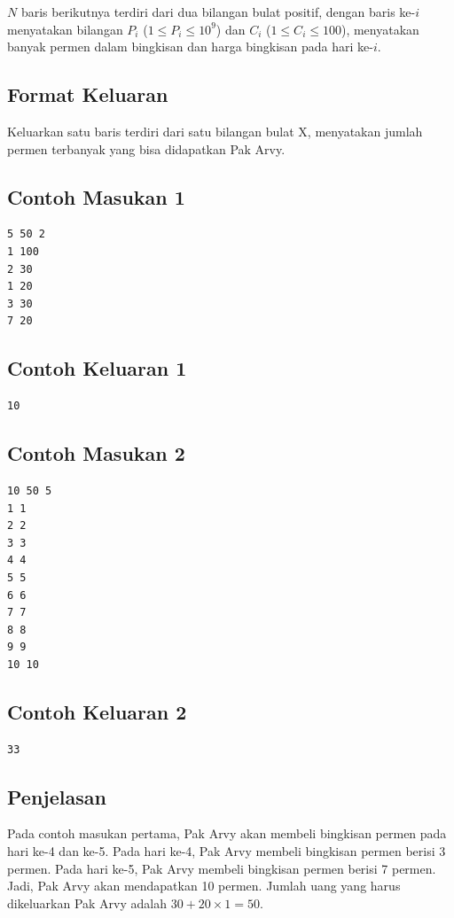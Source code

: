 \documentclass{article}
\begin{document}
$N$ baris berikutnya terdiri dari dua bilangan bulat positif, dengan baris ke-$i$ menyatakan bilangan $P_i$ ($1 \leq P_i \leq 10^9$) dan $C_i$ ($1 \leq C_i \leq 100$), menyatakan banyak permen dalam bingkisan dan harga bingkisan pada hari ke-$i$.

\subsection*{Format Keluaran}
Keluarkan satu baris terdiri dari satu bilangan bulat X, menyatakan jumlah permen terbanyak yang bisa didapatkan Pak Arvy.

\begin{multicols}{2}
\subsection*{Contoh Masukan 1}
\begin{lstlisting}
5 50 2
1 100
2 30
1 20
3 30
7 20
\end{lstlisting}
\columnbreak

\subsection*{Contoh Keluaran 1}
\begin{lstlisting}
10
\end{lstlisting}
\vfill
\null
\end{multicols}

\begin{multicols}{2}
\subsection*{Contoh Masukan 2}
\begin{lstlisting}
10 50 5
1 1
2 2
3 3
4 4
5 5
6 6
7 7
8 8
9 9
10 10
\end{lstlisting}
\columnbreak

\subsection*{Contoh Keluaran 2}
\begin{lstlisting}
33
\end{lstlisting}
\vfill
\null
\end{multicols}

\subsection*{Penjelasan}
Pada contoh masukan pertama, Pak Arvy akan membeli bingkisan permen pada hari ke-4 dan ke-5. Pada hari ke-4, Pak Arvy membeli bingkisan permen berisi 3 permen. Pada hari ke-5, Pak Arvy membeli bingkisan permen berisi 7 permen. Jadi, Pak Arvy akan mendapatkan 10 permen. Jumlah uang yang harus dikeluarkan Pak Arvy adalah $30 + 20 \times 1 = 50$.

\pagebreak
\end{document}
